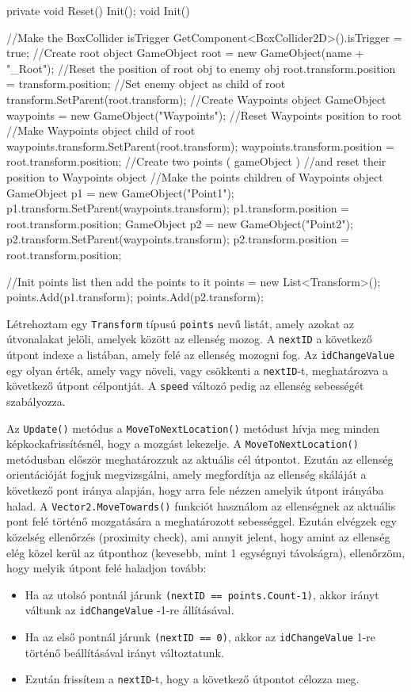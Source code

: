 \begin{java}
private void Reset()
{
    Init();
}
void Init()
{
    //Make the BoxCollider isTrigger
    GetComponent<BoxCollider2D>().isTrigger = true;
    //Create root object
    GameObject root = new GameObject(name + "_Root");
    //Reset the position of root obj to enemy obj
    root.transform.position = transform.position;
    //Set enemy object as child of root
    transform.SetParent(root.transform);
    //Create Waypoints object
    GameObject waypoints = new GameObject("Waypoints");
    //Reset Waypoints position to root
    //Make Waypoints object child of root
    waypoints.transform.SetParent(root.transform);
    waypoints.transform.position =
        root.transform.position;
    //Create two points ( gameObject )
    //and reset their position to Waypoints object
    //Make the points children of Waypoints object
    GameObject p1 = new GameObject("Point1"); 
    p1.transform.SetParent(waypoints.transform);
    p1.transform.position = root.transform.position;
    GameObject p2 = new GameObject("Point2"); 
    p2.transform.SetParent(waypoints.transform);
    p2.transform.position = root.transform.position;

    //Init points list then add the points to it
    points = new List<Transform>();
    points.Add(p1.transform);
    points.Add(p2.transform);
}
\end{java}

Létrehoztam egy \texttt{Transform} típusú \texttt{points} nevű listát, amely azokat az útvonalakat jelöli, amelyek között az ellenség mozog. A \texttt{nextID} a következő útpont indexe a listában, amely felé az ellenség mozogni fog. Az \texttt{idChangeValue} egy olyan érték, amely vagy növeli, vagy csökkenti a \texttt{nextID}-t, meghatározva a következő útpont célpontját. A \texttt{speed} változó pedig az ellenség sebességét szabályozza.

Az \texttt{Update()} metódus a \texttt{MoveToNextLocation()} metódust hívja meg minden képkockafrissítésnél, hogy a mozgást lekezelje. A \texttt{MoveToNextLocation()} metódusban először meghatározzuk az aktuális cél útpontot. Ezután az ellenség orientációját fogjuk megvizsgálni, amely megfordítja az ellenség skáláját a következő pont iránya alapján, hogy arra fele nézzen amelyik útpont irányába halad. A \texttt{Vector2.MoveTowards()} funkciót használom az ellenségnek az aktuális pont felé történő mozgatására a meghatározott sebességgel. Ezután elvégzek egy közelség ellenőrzés (proximity check), ami annyit jelent, hogy amint az ellenség elég közel kerül az útponthoz (kevesebb, mint 1 egységnyi távolságra), ellenőrzöm, hogy melyik útpont felé haladjon tovább:
\begin{itemize}
\item Ha az utolsó pontnál járunk \texttt{(nextID == points.Count-1)}, akkor irányt váltunk az \texttt{idChangeValue} -1-re állításával.
\item Ha az első pontnál járunk \texttt{(nextID == 0)}, akkor az \texttt{idChangeValue} 1-re történő beállításával irányt változtatunk.
\item Ezután frissítem a \texttt{nextID}-t, hogy a következő útpontot célozza meg.
\end{itemize}

